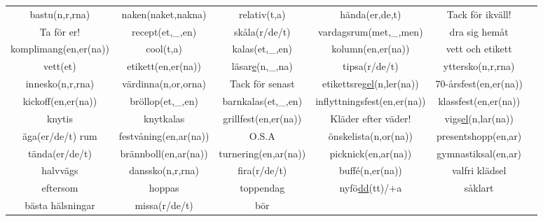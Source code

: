 \begin{center}
\begin{adjustwidth}{-2.4cm}{}
\begin{tabular}{|c c c c c c|}
            bastu(n,r,rna) & naken(naket,nakna) & relativ(t,a) & hända(er,de,t) & Tack för ikväll! &  \\
            Ta för er! & recept(et,\_,en) & skåla(r/de/t) & vardagsrum(met,\_,men) & dra sig hemåt &  \\
            komplimang(en,er(na)) & cool(t,a) & kalas(et,\_,en) & kolumn(en,er(na)) & vett och etikett &  \\
            vett(et) & etikett(en,er(na)) & läsar\underline{e}(n,\_,na) & tipsa(r/de/t) & yttersko(n,r,rna) &  \\
            innesko(n,r,rna) & värdinna(n,or,orna) & Tack för senast & etikettsreg\underline{el}(n,ler(na)) & 70-årsfest(en,er(na)) &  \\
            kickoff(en,er(na)) & bröllop(et,\_,en) & barnkalas(et,\_,en) & inflyttningsfest(en,er(na)) & klassfest(en,er(na)) &  \\
            knytis & knytkalas & grillfest(en,er(na)) & Kläder efter väder! & vigs\underline{el}(n,lar(na)) &  \\
            äga(er/de/t) rum & festvåning(en,ar(na)) & O.S.A & önskelista(n,or(na)) & presentshopp(en,ar) &  \\
            tända(er/de/t) & brännboll(en,ar(na)) & turnering(en,ar(na)) & picknick(en,ar(na)) & gymnastiksal(en,ar) &  \\
            halvvägs & danssko(n,r,rna) & fira(r/de/t) & buff\'e(n,er(na)) & valfri klädsel &  \\
            eftersom & hoppas & toppendag & nyfö\underline{dd}(tt)/$+$a & såklart &  \\
            bästa hälsningar & missa(r/de/t) & bör &  &  &  \\
            \hline
        \end{tabular}
    \end{adjustwidth}
\end{center}

